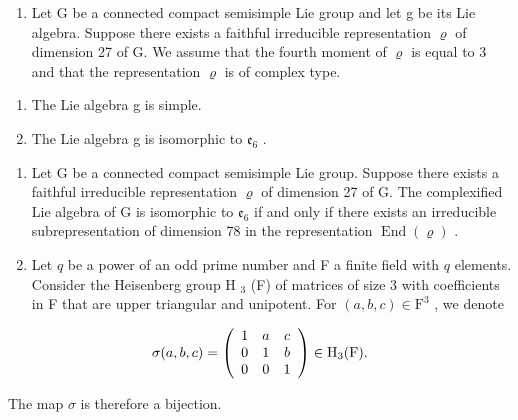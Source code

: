 \begin{enumerate}
\def\labelenumi{\arabic{enumi})}
\setcounter{enumi}{12}
\tightlist
\item
  Let G be a connected compact semisimple Lie group and let g be its Lie algebra. Suppose there exists a faithful irreducible representation \(\varrho\) of dimension 27 of G. We assume that the fourth moment of \(\varrho\) is equal to 3 and that the representation \(\varrho\) is of complex type.
\end{enumerate}

\begin{enumerate}
\def\labelenumi{\alph{enumi})}
\item
  The Lie algebra g is simple.
\item
  The Lie algebra g is isomorphic to \(\mathfrak{e}_{6}\) .
\end{enumerate}

\begin{enumerate}
\def\labelenumi{\arabic{enumi})}
\setcounter{enumi}{13}
\item
  Let G be a connected compact semisimple Lie group. Suppose there exists a faithful irreducible representation \(\varrho\) of dimension 27 of G. The complexified Lie algebra of G is isomorphic to \(\mathfrak{e}_6\) if and only if there exists an irreducible subrepresentation of dimension 78 in the representation \(\operatorname{End}(\varrho)\) .
\item
  Let \(q\) be a power of an odd prime number and F a finite field with \(q\) elements. Consider the Heisenberg group H \(_3\) (F) of matrices of size 3 with coefficients in F that are upper triangular and unipotent. For \((a, b, c) \in \mathrm{F}^3\) , we denote
\end{enumerate}

\[
\sigma (a, b, c) = \left( \begin{array}{c c c} 1 & a & c \\ 0 & 1 & b \\ 0 & 0 & 1 \end{array} \right) \in \mathrm{H} _ {3} (\mathrm{F}).
\]

The map \(\sigma\) is therefore a bijection.

